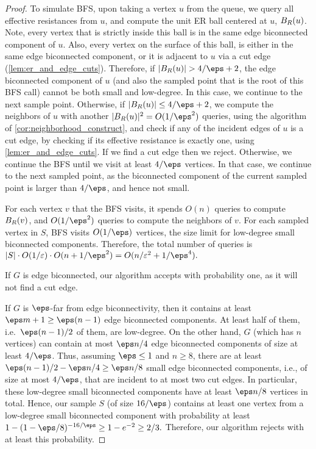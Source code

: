 {\begin{proof}
To simulate BFS, upon taking a vertex $u$ from the queue, we query all effective resistances from $u$, and compute the unit ER ball centered at $u$, $B_{R}(u)$. 
Note, every vertex that is strictly inside this ball is in the same edge biconnected component of $u$.  Also, every vertex on the surface of this ball, is either in the same edge biconnected component, or it is adjacent to $u$ via a cut edge (\cref{lem:er_and_edge_cuts}).  Therefore, if $|B_{\res}(u)|>4/\eps + 2$, the edge biconnected component of $u$ (and also the sampled point that is the root of this BFS call) cannot be both small and low-degree.  In this case, we continue to the next sample point. 
Otherwise, if $|B_{\res}(u)|\leq 4/\eps + 2$, we compute the neighbors of $u$ with another $|B_{\res}(u)|^2 = O(1/\eps^2)$ queries, using the algorithm of \cref{cor:neighborhood_construct}, and check if any of the incident edges of $u$ is a cut edge, by checking if its effective resistance is exactly one, using \cref{lem:er_and_edge_cuts}. 
If we find a cut edge then we reject. Otherwise, we continue the BFS until we visit at least $4/\eps$ vertices. In that case, we continue to the next sampled point, as the biconnected component of the current sampled point is larger than $4/\eps$, and hence not small.

For each vertex $v$ that the BFS visits, it spends $O(n)$ queries to compute $B_{R}(v)$, and $O(1/\eps^2)$ queries to compute the neighbors of $v$.  For each sampled vertex in $S$, BFS visits $O(1/\eps)$ vertices, the size limit for low-degree small biconnected components.  Therefore, the total number of queries is
\(
|S|\cdot O(1/\varepsilon) \cdot O(n+1/\eps^2) = O(n/\varepsilon^2+1/\eps^4).
\)

If $G$ is edge biconnected, our algorithm accepts with probability one, as it will not find a cut edge.

If $G$ is $\eps$-far from edge biconnectivity, then it contains at least 
\(
\eps m + 1 \geq \eps(n-1)
\) edge biconnected components.  At least half of them, i.e.~$\eps(n-1)/2$ of them, are low-degree.
On the other hand, $G$ (which has $n$ vertices) can contain at most $\eps n/4$ edge biconnected components of size at least $4/\eps$. Thus, assuming $\eps \leq 1$ and $n\geq 8$, there are at least %
\(
\eps(n-1)/2 - \eps n/4 \geq \eps n/8
\)
small edge biconnected components, i.e., of size at most $4/\eps$, that are incident to at most two cut edges.
In particular, these low-degree small biconnected components have at least $\eps n/8$ vertices in total.  Hence, our sample $S$ (of size $16/\eps$) contains at least one vertex from a low-degree small biconnected component with probability at least 
\(
1-(1-\eps/8)^{-16/\eps} \geq 1-e^{-2}\geq 2/3.
\)
Therefore, our algorithm rejects with at least this probability.
\end{proof}
}
